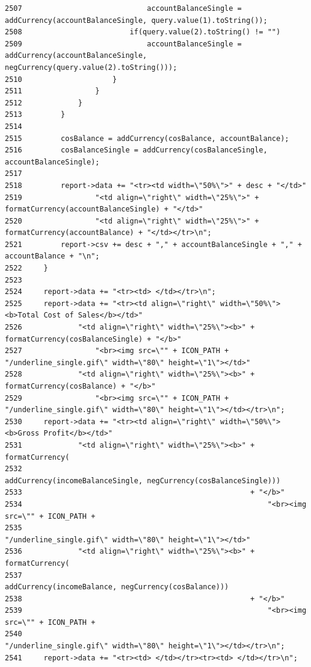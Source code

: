 \begin{verbatim}
2507                             accountBalanceSingle = addCurrency(accountBalanceSingle, query.value(1).toString());
2508                         if(query.value(2).toString() != "")
2509                             accountBalanceSingle = addCurrency(accountBalanceSingle, negCurrency(query.value(2).toString()));
2510                     }
2511                 }
2512             }
2513         }
2514 
2515         cosBalance = addCurrency(cosBalance, accountBalance);
2516         cosBalanceSingle = addCurrency(cosBalanceSingle, accountBalanceSingle);
2517 
2518         report->data += "<tr><td width=\"50%\">" + desc + "</td>"
2519                 "<td align=\"right\" width=\"25%\">" + formatCurrency(accountBalanceSingle) + "</td>"
2520                 "<td align=\"right\" width=\"25%\">" + formatCurrency(accountBalance) + "</td></tr>\n";
2521         report->csv += desc + "," + accountBalanceSingle + "," + accountBalance + "\n";
2522     }
2523 
2524     report->data += "<tr><td> </td></tr>\n";
2525     report->data += "<tr><td align=\"right\" width=\"50%\"><b>Total Cost of Sales</b></td>"
2526             "<td align=\"right\" width=\"25%\"><b>" + formatCurrency(cosBalanceSingle) + "</b>"
2527                 "<br><img src=\"" + ICON_PATH + "/underline_single.gif\" width=\"80\" height=\"1\"></td>"
2528             "<td align=\"right\" width=\"25%\"><b>" + formatCurrency(cosBalance) + "</b>"
2529                 "<br><img src=\"" + ICON_PATH + "/underline_single.gif\" width=\"80\" height=\"1\"></td></tr>\n";
2530     report->data += "<tr><td align=\"right\" width=\"50%\"><b>Gross Profit</b></td>"
2531             "<td align=\"right\" width=\"25%\"><b>" + formatCurrency(
2532                                                       addCurrency(incomeBalanceSingle, negCurrency(cosBalanceSingle)))
2533                                                     + "</b>"
2534                                                         "<br><img src=\"" + ICON_PATH + 
2535                                                         "/underline_single.gif\" width=\"80\" height=\"1\"></td>"
2536             "<td align=\"right\" width=\"25%\"><b>" + formatCurrency(
2537                                                       addCurrency(incomeBalance, negCurrency(cosBalance)))
2538                                                     + "</b>"
2539                                                         "<br><img src=\"" + ICON_PATH +
2540                                                         "/underline_single.gif\" width=\"80\" height=\"1\"></td></tr>\n";
2541     report->data += "<tr><td> </td></tr><tr><td> </td></tr>\n";

\end{verbatim}
